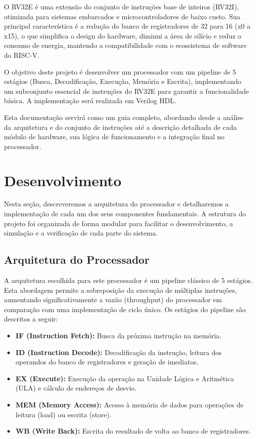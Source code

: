 \documentclass[12pt]{article}
\begin{document}
O RV32E é uma extensão do conjunto de instruções base de inteiros (RV32I), otimizada para sistemas embarcados e microcontroladores de baixo custo. Sua principal característica é a redução do banco de registradores de 32 para 16 (x0 a x15), o que simplifica o design do hardware, diminui a área de silício e reduz o consumo de energia, mantendo a compatibilidade com o ecossistema de software do RISC-V.

O objetivo deste projeto é desenvolver um processador com um pipeline de 5 estágios (Busca, Decodificação, Execução, Memória e Escrita), implementando um subconjunto essencial de instruções do RV32E para garantir a funcionalidade básica. A implementação será realizada em Verilog HDL.

Esta documentação servirá como um guia completo, abordando desde a análise da arquitetura e do conjunto de instruções até a descrição detalhada de cada módulo de hardware, sua lógica de funcionamento e a integração final no processador.

\section{Desenvolvimento} \label{sec:desenvolvimento}

Nesta seção, descreveremos a arquitetura do processador e detalharemos a implementação de cada um dos seus componentes fundamentais. A estrutura do projeto foi organizada de forma modular para facilitar o desenvolvimento, a simulação e a verificação de cada parte do sistema.

\subsection{Arquitetura do Processador} 
A arquitetura escolhida para este processador é um pipeline clássico de 5 estágios. Esta abordagem permite a sobreposição da execução de múltiplas instruções, aumentando significativamente a vazão (throughput) do processador em comparação com uma implementação de ciclo único. Os estágios do pipeline são descritos a seguir: 
\begin{itemize} \item \textbf{IF (Instruction Fetch):} Busca da próxima instrução na memória. \item \textbf{ID (Instruction Decode):} Decodificação da instrução, leitura dos operandos do banco de registradores e geração de imediatos. 
\item \textbf{EX (Execute):} Execução da operação na Unidade Lógica e Aritmética (ULA) e cálculo de endereços de desvio. 
\item \textbf{MEM (Memory Access):} Acesso à memória de dados para operações de leitura (load) ou escrita (store). 
\item \textbf{WB (Write Back):} Escrita do resultado de volta ao banco de registradores. \end{itemize} 
\end{document}
